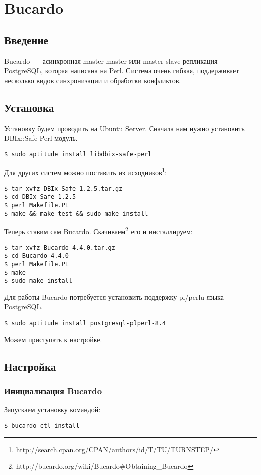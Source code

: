 \section{Bucardo}
\subsection{Введение}
Bucardo~--- асинхронная master-master или master-slave репликация PostgreSQL, которая написана на Perl.
Система очень гибкая, поддерживает несколько видов синхронизации и обработки конфликтов.

\subsection{Установка}
Установку будем проводить на Ubuntu Server. Сначала нам нужно установить DBIx::Safe Perl модуль.
\begin{lstlisting}[label=lst:bucardo1,caption=Установка]
$ sudo aptitude install libdbix-safe-perl
\end{lstlisting}

Для других систем можно поставить из исходников\footnote{http://search.cpan.org/CPAN/authors/id/T/TU/TURNSTEP/}:
\begin{lstlisting}[label=lst:bucardo2,caption=Установка]
$ tar xvfz DBIx-Safe-1.2.5.tar.gz
$ cd DBIx-Safe-1.2.5
$ perl Makefile.PL
$ make && make test && sudo make install
\end{lstlisting}

Теперь ставим сам Bucardo. Скачиваем\footnote{http://bucardo.org/wiki/Bucardo\#Obtaining\_Bucardo} его и инсталлируем:
\begin{lstlisting}[label=lst:bucardo3,caption=Установка]
$ tar xvfz Bucardo-4.4.0.tar.gz
$ cd Bucardo-4.4.0
$ perl Makefile.PL
$ make
$ sudo make install
\end{lstlisting}

Для работы Bucardo потребуется установить поддержку pl/perlu языка PostgreSQL.
\begin{lstlisting}[label=lst:bucardo4,caption=Установка]
$ sudo aptitude install postgresql-plperl-8.4
\end{lstlisting}

Можем приступать к настройке.

\subsection{Настройка}
\subsubsection{Инициализация Bucardo}
Запускаем установку командой:
\begin{lstlisting}[label=lst:bucardo5,caption=Инициализация Bucardo]
$ bucardo_ctl install
\end{lstlisting}

